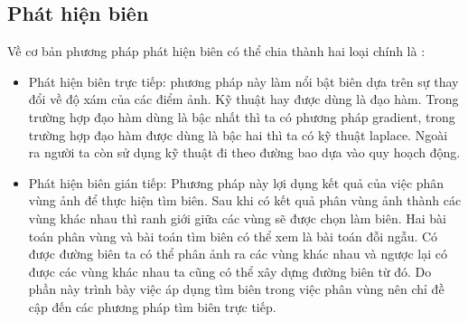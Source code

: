 \documentclass[12pt,oneside,a4]{report}
\begin{document}
\subsection{Phát hiện biên }
Về cơ bản phương pháp phát hiện biên có thể chia thành hai loại chính là :
\begin{itemize}
\item Phát hiện biên trực tiếp: phương pháp này làm nổi bật biên dựa trên sự thay đổi về độ xám của các điểm ảnh. Kỹ thuật hay được dùng là đạo hàm. Trong trường hợp đạo hàm dùng là bậc nhất thì ta có phương pháp gradient, trong trường hợp đạo hàm được dùng là bậc hai thì ta có kỹ thuật laplace. Ngoài ra người ta còn sử dụng kỹ thuật đi theo đường bao dựa vào quy hoạch động.
\item Phát hiện biên gián tiếp:  Phương pháp này lợi dụng kết quả của việc phân vùng ảnh để thực hiện tìm biên. Sau khi có kết quả phân vùng ảnh thành các vùng khác nhau thì ranh giới giữa các vùng sẽ được chọn làm biên. Hai bài toán phân vùng  và bài toán tìm biên có thể xem là bài toán đỗi ngẫu. Có được đường biên ta có thể phân ảnh ra các vùng khác nhau và ngược lại có được các vùng khác nhau ta cũng có thể xây dựng đường biên từ đó. Do phần này trình bày việc áp dụng tìm biên trong việc phân vùng nên chỉ đề cập đến các phương pháp tìm biên trực tiếp.
\end{itemize}
\end{document}
